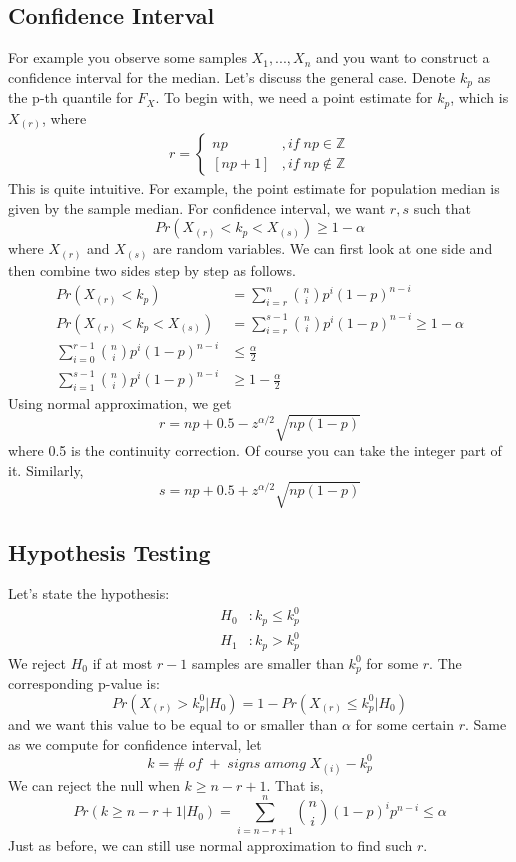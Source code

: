 \documentclass[twoside]{article}
\begin{document}
\subsection{Confidence Interval}
For example you observe some samples $X_1, ..., X_n$ and you want to construct a confidence interval for the median. Let's discuss the general case. Denote $k_p$ as the p-th quantile for $F_X$. To begin with, we need a point estimate for $k_p$, which is $X_{(r)}$, where
\begin{align*}
	r = \begin{cases}
		np &, if \; np \in \mathbb{Z} \\
		[np+1] &, if \; np \notin \mathbb{Z}
	\end{cases}
\end{align*}
This is quite intuitive. For example, the point estimate for population median is given by the sample median. For confidence interval, we want $r,s$ such that
$$
Pr \left( X_{(r)} < k_p < X_{(s)} \right) \geqslant 1 - \alpha
$$
where $X_{(r)}$ and $X_{(s)}$ are random variables. We can first look at one side and then combine two sides step by step as follows. 
\begin{align*}
	Pr \left( X_{(r)} < k_p \right) &= \sum_{i=r}^{n} \binom{n}{i} p^i (1-p)^{n-i} \\
	Pr \left( X_{(r)} < k_p < X_{(s)} \right) &= \sum_{i=r}^{s-1} \binom{n}{i} p^i (1-p)^{n-i} \geqslant 1 - \alpha \\
	\sum_{i=0}^{r-1} \binom{n}{i} p^i (1 - p)^{n-i} &\leqslant \frac{\alpha}{2} \\
	\sum_{i=1}^{s-1} \binom{n}{i} p^i (1-p)^{n-i} &\geqslant 1 - \frac{\alpha}{2}
\end{align*}
Using normal approximation, we get
$$
r = np + 0.5 - z^{\alpha / 2} \sqrt{np(1-p)}
$$
where 0.5 is the continuity correction. Of course you can take the integer part of it. Similarly, 
$$
s = np + 0.5 + z^{\alpha / 2} \sqrt{np(1-p)}
$$
	
\subsection{Hypothesis Testing}
Let's state the hypothesis: 
\begin{align*}
	H_0&: k_p \leqslant k_p^0 \\
	H_1&: k_p > k_p^0
\end{align*}
We reject $H_0$ if at most $r-1$ samples are smaller than $k_p^0$ for some $r$. The corresponding p-value is:
$$
Pr \left( X_{(r)} > k_p^0 | H_0 \right) = 1 - Pr \left( X_{(r)} \leqslant k_p^0 | H_0 \right)
$$
and we want this value to be equal to or smaller than $\alpha$ for some certain $r$. Same as we compute for confidence interval, let 
$$
k = \# \; of \; + \; signs \; among \; X_{(i)} - k_p^0
$$
We can reject the null when $k \geqslant n-r+1$. That is, 
$$
Pr \left( k \geqslant n-r+1 | H_0 \right) = \sum_{i=n-r+1}^{n} \binom{n}{i} (1-p)^i p^{n-i} \leqslant \alpha
$$
Just as before, we can still use normal approximation to find such $r$. 
\end{document}
